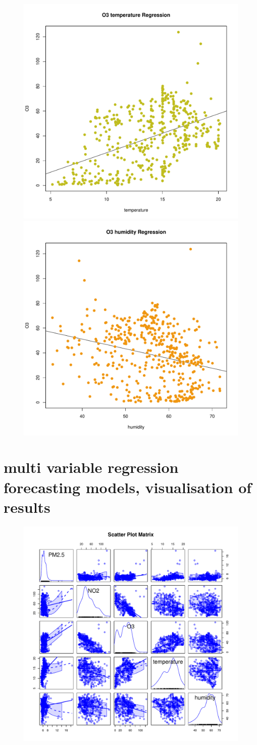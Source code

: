 \documentclass[a4paper,12pt,reqno]{report}
\begin{document}
\begin{figure}[H]
    \includegraphics[width=0.4\linewidth]{figures/O3_temperature_Regression.pdf}
    \includegraphics[width=0.4\linewidth]{figures/O3_humidity_Regression.pdf}
\end{figure}
\section{multi variable regression forecasting models, visualisation of results}
\label{sec:multi variable regression forecasting models, visualisation of results}
\begin{figure}[H]
    \centering
    \vspace{-0.35cm}
    \includegraphics[width=0.4\linewidth]{figures/mul_reg_scatterplotMatrix.pdf}
\end{figure}
\end{document}
